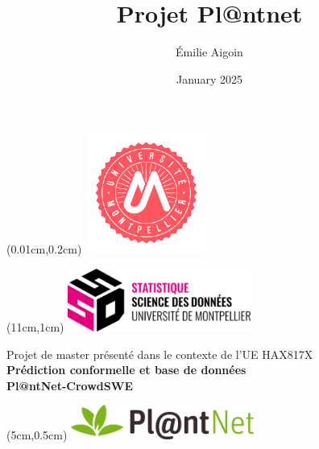 \documentclass[a4paper,12pt]{article}
\title{Projet Pl@ntnet}
\author{Émilie Aigoin}
\date{January 2025}
\begin{document}
\begin{textblock*}{3cm}(0.01cm,0.2cm)
    \includegraphics[width=4cm]{images/Universite.png}
\end{textblock*}

\begin{textblock*}{3cm}(11cm,1cm)
    \includegraphics[width=6cm]{images/SSD.png} 
\end{textblock*}

\vspace{8cm}
\begin{center}
\large{Projet de master présenté dans le contexte de l'UE HAX817X} \\ \vspace{0.4cm}
    {\LARGE \textbf{Prédiction conformelle et base de données \\ \vspace{0.4cm} Pl@ntNet-CrowdSWE}}\\[1cm]
\end{center}

\begin{textblock*}{3cm}(5cm,0.5cm)
    \includegraphics[width=6cm]{images/plantenet.png}
\end{textblock*}
\end{document}
